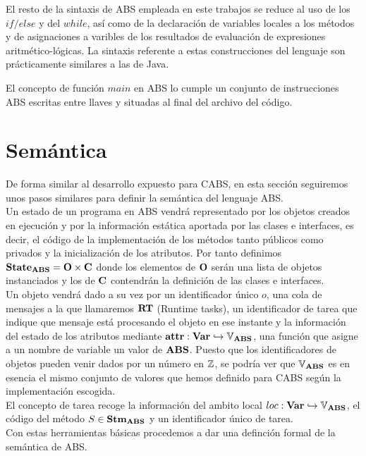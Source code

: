 El resto de la sintaxis de ABS empleada en este trabajos se reduce al uso de los $if/else$ y del $while$, así como de la declaración de variables locales a los métodos y de asignaciones a varibles de los resultados de evaluación de expresiones aritmético-lógicas. La sintaxis referente a estas construcciones del lenguaje son prácticamente similares a las de Java.

El concepto de función $main$ en ABS lo cumple un conjunto de instrucciones ABS escritas entre llaves y situadas al final del archivo del código.

\section{Semántica}

De forma similar al desarrollo expuesto para CABS, en esta sección seguiremos unos pasos similares para definir la semántica del lenguaje ABS.\\

Un estado de un programa en ABS vendrá representado por los objetos creados en ejecución y por la información estática aportada por las clases e interfaces, es decir, el código de la implementación de los métodos tanto públicos como privados y la inicialización de los atributos. Por tanto definimos $\textbf{State}_{\textbf{ABS}} = \mathbf{O} \times \mathbf{C}$ donde los elementos de $\mathbf{O}$ serán una lista de objetos instanciados y los de $\mathbf{C}$ contendrán la definición de las clases e interfaces.\\

Un objeto vendrá dado a su vez por un identificador único $o$, una cola de mensajes a la que llamaremos $\textbf{RT}$ (Runtime tasks), un identificador de tarea que indique que mensaje está procesando el objeto en ese instante y la información del estado de los atributos mediante $\textbf{attr}: \textbf{Var} \hookrightarrow \mathbb{V}_{\textbf{ABS}}$, una función que asigne a un nombre de variable un valor de $\textbf{ABS}$. Puesto que los identificadores de objetos pueden venir dados por un número en $\mathbb{Z}$, se podría ver que $\mathbb{V}_{\textbf{ABS}}$ es en esencia el mismo conjunto de valores que hemos definido para CABS según la implementación escogida.\\

El concepto de tarea recoge la información del ambito local $loc: \textbf{Var} \hookrightarrow \mathbb{V}_{\textbf{ABS}}$, el código del método $S \in \textbf{Stm}_{\textbf{ABS}}$ y un identificador único de tarea.\\

Con estas herramientas básicas procedemos a dar una definción formal de la semántica de ABS.
